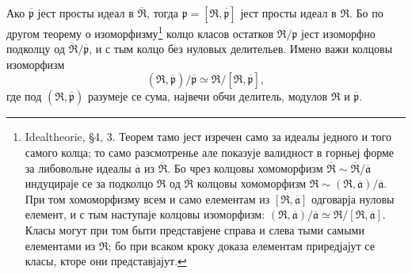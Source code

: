 \documentclass[11pt]{article}
\begin{document}
Ако $\overline{\mathfrak p}$ јест просты идеал в $\overline{\mathfrak R}$, тогда $\mathfrak p=[\mathfrak R,\overline{\mathfrak p}]$ јест просты идеал в $\mathfrak R$. Бо по другом теорему о изоморфизму\footnote{Idealtheorie, \S 4, 3. Теорем тамо јест изречен само за идеалы једного и того самого колца; то само разсмотренье але показује валидност в горньеј форме за либовольне идеалы $\overline{\mathfrak a}$ из $\overline{\mathfrak R}$. Бо чрез колцовы хомоморфизм $\overline{\mathfrak R}\sim\overline{\mathfrak R}/\overline{\mathfrak a}$ индуцираје се за подколцо $\mathfrak R$ од $\overline{\mathfrak R}$ колцовы хомоморфизм $\mathfrak R\sim(\mathfrak R,\overline{\mathfrak a})/\overline{\mathfrak a}$. При том хомоморфизму всем и само елементам из $[\mathfrak R,\overline{\mathfrak a}]$ одговарја нуловы елемент, и с тым наступаје колцовы изоморфизм: $(\mathfrak R,\overline{\mathfrak a})/\overline{\mathfrak a}\simeq \mathfrak R/[\mathfrak R,\overline{\mathfrak a}]$. Класы могут при том быти представјене справа и слева тыми самыми елементами из $\mathfrak R$; бо при всаком кроку доказа елементам приредјајут се класы, кторе они представјајут.} колцо класов остатков $\mathfrak R/\mathfrak p$ јест изоморфно подколцу од $\overline{\mathfrak R}/\overline{\mathfrak p}$, и с тым колцо без нуловых делительев. Имено важи колцовы изоморфизм
\[
   (\mathfrak R,\overline{\mathfrak p})/\overline{\mathfrak p}
      \simeq \mathfrak R/[\mathfrak R,\overline{\mathfrak p}],
\]
где под $(\mathfrak R,\overline{\mathfrak p})$ разумеје се сума, највечи обчи делитель, модулов $\mathfrak R$ и $\overline{\mathfrak p}$.
\end{document}
